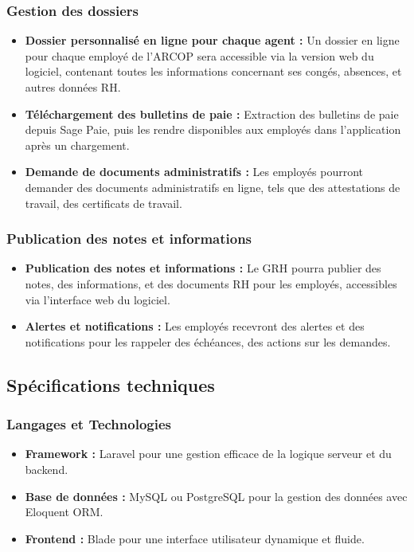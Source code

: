 \subsubsection{Gestion des dossiers}
\begin{itemize}
    \item \textbf{Dossier personnalisé en ligne pour chaque agent :} Un dossier en ligne pour chaque employé de l'ARCOP sera accessible via la version web du logiciel, contenant toutes les informations concernant ses congés, absences, et autres données RH.
    
    \item \textbf{Téléchargement des bulletins de paie :} Extraction des bulletins de paie depuis Sage Paie, puis les rendre disponibles aux employés dans l'application après un chargement.
    \item \textbf{Demande de documents administratifs :} Les employés
    pourront demander des documents administratifs en ligne, tels que des attestations de travail, des certificats de travail.
\end{itemize}

\subsubsection{Publication des notes et informations}
\begin{itemize}
    \item \textbf{Publication des notes et informations :} Le GRH pourra publier des notes, des informations, et des documents RH pour les employés, accessibles via l'interface web du logiciel.
    \item \textbf{Alertes et notifications :} Les employés recevront des alertes et des notifications pour les rappeler des échéances, des actions sur les demandes.
\end{itemize}

\subsection{Spécifications techniques}

\subsubsection{Langages et Technologies}
\begin{itemize}
    \item \textbf{Framework :} Laravel pour une gestion efficace de la logique serveur et du backend.
    \item \textbf{Base de données :} MySQL ou PostgreSQL pour la gestion des données avec Eloquent ORM.
    \item \textbf{Frontend :} Blade pour une interface utilisateur dynamique et fluide.

\end{itemize}


